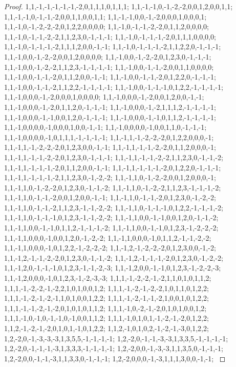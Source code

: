\documentclass{article}
\begin{document}
\begin{proof}
{{1,1,-1,-1,-1,-1,-1,-2,0,1,1,1,0,1,1,1; 1,1,-1,-1,0,-1,-2,-2,0,0,1,2,0,0,1,1; 1,1,-1,-1,0,-1,-1,-2,0,0,1,1,0,0,1,1; 1,1,-1,-1,0,0,-1,-2,0,0,0,1,0,0,0,1; 1,1,-1,0,-1,-2,-2,-2,0,1,2,2,0,0,0,0; 1,1,-1,0,-1,-1,-2,-2,0,1,1,2,0,0,0,0; 1,1,-1,0,-1,-1,-2,-2,1,1,2,3,0,-1,-1,-1; 1,1,-1,0,-1,-1,-1,-2,0,1,1,1,0,0,0,0; 1,1,-1,0,-1,-1,-1,-2,1,1,1,2,0,0,-1,-1; 1,1,-1,0,-1,-1,-1,-2,1,1,2,2,0,-1,-1,-1; 1,1,-1,0,0,-1,-2,-2,0,0,1,2,0,0,0,0; 1,1,-1,0,0,-1,-2,-2,0,1,2,3,0,-1,-1,-1;
1,1,-1,0,0,-1,-2,-2,1,1,2,3,-1,-1,-1,-1; 1,1,-1,0,0,-1,-1,-2,0,0,1,1,0,0,0,0; 1,1,-1,0,0,-1,-1,-2,0,1,1,2,0,0,-1,-1; 1,1,-1,0,0,-1,-1,-2,0,1,2,2,0,-1,-1,-1; 1,1,-1,0,0,-1,-1,-2,1,1,2,2,-1,-1,-1,-1; 1,1,-1,0,0,-1,-1,-1,0,1,2,2,-1,-1,-1,-1; 1,1,-1,0,0,0,-1,-2,0,0,0,1,0,0,0,0; 1,1,-1,0,0,0,-1,-2,0,0,1,2,0,0,-1,-1; 1,1,-1,0,0,0,-1,-2,0,1,1,2,0,-1,-1,-1; 1,1,-1,0,0,0,-1,-2,1,1,1,2,-1,-1,-1,-1; 1,1,-1,0,0,0,-1,-1,0,0,1,2,0,-1,-1,-1; 1,1,-1,0,0,0,-1,-1,0,1,1,2,-1,-1,-1,-1;
1,1,-1,0,0,0,0,-1,0,0,0,1,0,0,-1,-1; 1,1,-1,0,0,0,0,-1,0,0,1,1,0,-1,-1,-1; 1,1,-1,0,0,0,0,-1,0,1,1,1,-1,-1,-1,-1; 1,1,-1,1,-1,-2,-2,-2,0,1,2,2,0,0,0,-1; 1,1,-1,1,-1,-2,-2,-2,0,1,2,3,0,0,-1,-1; 1,1,-1,1,-1,-1,-2,-2,0,1,1,2,0,0,0,-1; 1,1,-1,1,-1,-1,-2,-2,0,1,2,3,0,-1,-1,-1; 1,1,-1,1,-1,-1,-2,-2,1,1,2,3,0,-1,-1,-2; 1,1,-1,1,-1,-1,-1,-2,0,1,1,2,0,0,-1,-1; 1,1,-1,1,-1,-1,-1,-2,0,1,2,2,0,-1,-1,-1; 1,1,-1,1,-1,-1,-1,-2,1,1,2,3,0,-1,-2,-2; 1,1,-1,1,0,-1,-2,-2,0,0,1,2,0,0,0,-1;
1,1,-1,1,0,-1,-2,-2,0,1,2,3,0,-1,-1,-2; 1,1,-1,1,0,-1,-2,-2,1,1,2,3,-1,-1,-1,-2; 1,1,-1,1,0,-1,-1,-2,0,0,1,2,0,0,-1,-1; 1,1,-1,1,0,-1,-1,-2,0,1,2,3,0,-1,-2,-2; 1,1,-1,1,0,-1,-1,-2,1,1,2,3,-1,-1,-2,-2; 1,1,-1,1,0,-1,-1,-1,0,1,2,2,-1,-1,-1,-2; 1,1,-1,1,0,-1,-1,-1,0,1,2,3,-1,-1,-2,-2; 1,1,-1,1,0,0,-1,-1,0,0,1,2,0,-1,-1,-2; 1,1,-1,1,0,0,-1,-1,0,1,1,2,-1,-1,-1,-2; 1,1,-1,1,0,0,-1,-1,0,1,2,3,-1,-2,-2,-2; 1,1,-1,1,0,0,0,-1,0,0,1,2,0,-1,-2,-2; 1,1,-1,1,0,0,0,-1,0,1,1,2,-1,-1,-2,-2;
1,1,-1,1,0,0,0,-1,0,1,2,2,-1,-2,-2,-2; 1,1,-1,2,-1,-2,-2,-2,0,1,2,3,0,0,-1,-2; 1,1,-1,2,-1,-1,-2,-2,0,1,2,3,0,-1,-1,-2; 1,1,-1,2,-1,-1,-1,-2,0,1,2,3,0,-1,-2,-2; 1,1,-1,2,0,-1,-1,-1,0,1,2,3,-1,-1,-2,-3; 1,1,-1,2,0,0,-1,-1,0,1,2,3,-1,-2,-2,-3; 1,1,-1,2,0,0,0,-1,0,1,2,3,-1,-2,-3,-3; 1,1,1,-1,-2,-2,-1,-2,1,1,0,1,0,1,1,2; 1,1,1,-1,-2,-2,-1,-2,2,1,0,1,0,0,1,2; 1,1,1,-1,-2,-1,-2,-2,1,0,1,1,0,1,2,2; 1,1,1,-1,-2,-1,-2,-1,1,0,1,0,0,1,2,2; 1,1,1,-1,-2,-1,-1,-2,1,0,0,1,0,1,2,2;
1,1,1,-1,-1,-2,-1,-2,0,1,0,1,0,1,1,2; 1,1,1,-1,0,-2,-1,-2,0,1,0,1,0,0,1,2; 1,1,1,-1,0,-1,0,-1,-1,0,-1,0,0,1,1,2; 1,1,1,-1,0,1,0,1,-1,-2,-1,-2,0,1,2,2; 1,1,2,-1,-2,-1,-2,0,1,0,1,-1,0,1,2,2; 1,1,2,-1,0,1,0,2,-1,-2,-1,-3,0,1,2,2; 1,2,-2,0,-1,-3,-3,-3,1,3,5,5,-1,-1,-1,-1; 1,2,-2,0,-1,-1,-3,-3,1,3,3,5,-1,-1,-1,-1; 1,2,-2,0,-1,-1,-1,-3,1,3,3,3,-1,-1,-1,-1; 1,2,-2,0,0,-1,-3,-3,1,1,3,5,0,-1,-1,-1; 1,2,-2,0,0,-1,-1,-3,1,1,3,3,0,-1,-1,-1; 1,2,-2,0,0,0,-1,-3,1,1,1,3,0,0,-1,-1;
}}
\end{proof}
\end{document}
